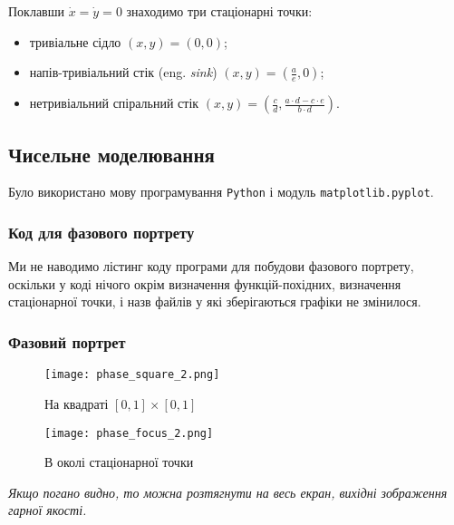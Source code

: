Поклавши $\dot x = \dot y = 0$ знаходимо три стаціонарні точки: 
\begin{itemize}
	\item тривіальне сідло $(x, y) = (0, 0)$;
	\item напів-тривіальний стік (eng. \textit{sink}) $(x, y) = \left( \frac{a}{e}, 0 \right)$;
	\item нетривіальний спіральний стік $(x, y) = \left(\frac{c}{d}, \frac{a \cdot d - c \cdot e}{b \cdot d}\right)$.
\end{itemize}

\newpage

\subsection{Чисельне моделювання}

Було використано мову програмування \texttt{Python} і модуль \texttt{matplotlib.pyplot}.

\subsubsection{Код для фазового портрету}

Ми не наводимо лістинг коду програми для побудови  фазового портрету, оскільки у коді нічого окрім визначення функцій-похідних, визначення стаціонарної точки, і назв файлів у які зберігаються графіки не змінилося.

\subsubsection{Фазовий портрет}

\begin{minipage}[t]{.5\textwidth}
	\begin{figure}[H]
		\centering
		\caption{На квадраті $[0, 1] \times [0, 1]$}
		\texttt{[image: phase\_square\_2.png]}
	\end{figure}
\end{minipage}
\begin{minipage}[t]{.5\textwidth}
	\begin{figure}[H]
		\centering
		\caption{В околі стаціонарної точки}
		\texttt{[image: phase\_focus\_2.png]}
	\end{figure}
\end{minipage}

\textit{Якщо погано видно, то можна розтягнути на весь екран, вихідні зображення гарної якості.} \medskip

